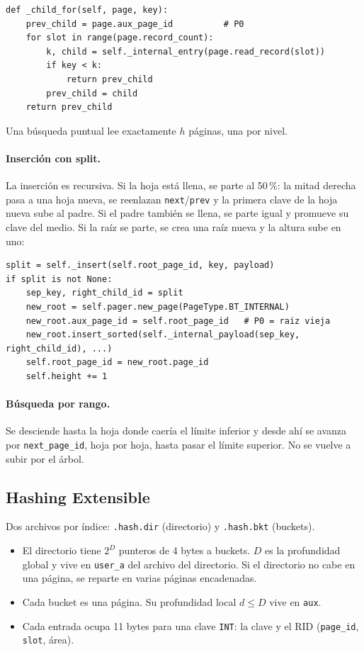 \documentclass[11pt,a4paper]{article}
\newcommand{\code}[1]{\texttt{#1}}
\begin{document}
\begin{lstlisting}
def _child_for(self, page, key):
    prev_child = page.aux_page_id          # P0
    for slot in range(page.record_count):
        k, child = self._internal_entry(page.read_record(slot))
        if key < k:
            return prev_child
        prev_child = child
    return prev_child
\end{lstlisting}

Una búsqueda puntual lee exactamente $h$ páginas, una por nivel.

\paragraph{Inserción con split.} La inserción es recursiva. Si la hoja está llena, se
parte al 50\,\%: la mitad derecha pasa a una hoja nueva, se reenlazan
\code{next}/\code{prev} y la primera clave de la hoja nueva sube al padre. Si el
padre también se llena, se parte igual y promueve su clave del medio. Si la raíz se
parte, se crea una raíz nueva y la altura sube en uno:

\begin{lstlisting}
split = self._insert(self.root_page_id, key, payload)
if split is not None:
    sep_key, right_child_id = split
    new_root = self.pager.new_page(PageType.BT_INTERNAL)
    new_root.aux_page_id = self.root_page_id   # P0 = raiz vieja
    new_root.insert_sorted(self._internal_payload(sep_key, right_child_id), ...)
    self.root_page_id = new_root.page_id
    self.height += 1
\end{lstlisting}

\paragraph{Búsqueda por rango.} Se desciende hasta la hoja donde caería el límite
inferior y desde ahí se avanza por \code{next\_page\_id}, hoja por hoja, hasta pasar
el límite superior. No se vuelve a subir por el árbol.

\subsection{Hashing Extensible}

Dos archivos por índice: \code{.hash.dir} (directorio) y \code{.hash.bkt} (buckets).

\begin{itemize}
  \item El directorio tiene $2^D$ punteros de 4 bytes a buckets. $D$ es la
        profundidad global y vive en \code{user\_a} del archivo del directorio. Si el
        directorio no cabe en una página, se reparte en varias páginas encadenadas.
  \item Cada bucket es una página. Su profundidad local $d \le D$ vive en \code{aux}.
  \item Cada entrada ocupa 11 bytes para una clave \code{INT}: la clave y el RID
        (\code{page\_id}, \code{slot}, área).
\end{itemize}
\end{document}
